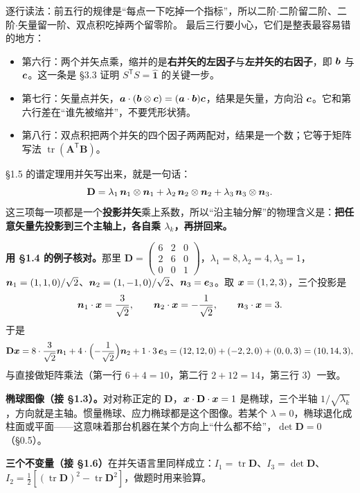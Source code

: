 \documentclass[11pt]{ctexart}
\newcommand{\ten}[1]{\mathbf{#1}}
\newcommand{\unitd}{\hat{\ten{1}}}
\newcommand{\tr}{\operatorname{tr}}
\let\origsubhdr\subhdr
\renewcommand{\subhdr}[1]{\par\needspace{3\baselineskip}\origsubhdr{#1}}
\begin{document}
逐行读法：前五行的规律是“每点一下吃掉一个指标”，所以二阶$\cdot$二阶留二阶、二阶$\cdot$矢量留一阶、双点积吃掉两个留零阶。
最后三行要小心，它们是整表最容易错的地方：
\begin{itemize}
\item 第六行：两个并矢点乘，缩并的是\textbf{右并矢的左因子}与\textbf{左并矢的右因子}，即 $\boldsymbol{b}$ 与 $\boldsymbol{c}$。这一条是 §3.3 证明 $S^{\mathsf T}S=\unitd$ 的关键一步。
\item 第七行：矢量点并矢，$\boldsymbol{a}\cdot(\boldsymbol{b}\otimes\boldsymbol{c})=(\boldsymbol{a}\cdot\boldsymbol{b})\boldsymbol{c}$，结果是矢量，方向沿 $\boldsymbol{c}$。它和第六行差在“谁先被缩并”，不要凭形状猜。
\item 第八行：双点积把两个并矢的四个因子两两配对，结果是一个数；它等于矩阵写法 $\tr(\ten A^{\mathsf T}\ten B)$。
\end{itemize}


§1.5 的谱定理用并矢写出来，就是一句话：
\[
\ten D=\lambda_1\,\vect n_1\otimes\vect n_1+\lambda_2\,\vect n_2\otimes\vect n_2+\lambda_3\,\vect n_3\otimes\vect n_3 .
\]
这三项每一项都是一个\textbf{投影并矢}乘上系数，所以“沿主轴分解”的物理含义是：\textbf{把任意矢量先投影到三个主轴上，各自乘 $\lambda_k$，再拼回来。}

\textbf{用 §1.4 的例子核对。}那里 $\ten D=\begin{pmatrix}6&2&0\\2&6&0\\0&0&1\end{pmatrix}$，$\lambda_1=8,\lambda_2=4,\lambda_3=1$，$\boldsymbol{n}_1=(1,1,0)/\sqrt2$、$\boldsymbol{n}_2=(1,-1,0)/\sqrt2$、$\boldsymbol{n}_3=\boldsymbol{e}_3$。取 $\boldsymbol{x}=(1,2,3)$，三个投影是
\[
\boldsymbol{n}_1\cdot\boldsymbol{x}=\frac{3}{\sqrt2},\qquad
\boldsymbol{n}_2\cdot\boldsymbol{x}=-\frac{1}{\sqrt2},\qquad
\boldsymbol{n}_3\cdot\boldsymbol{x}=3 .
\]
于是
\[
\ten D\vect x=8\cdot\frac{3}{\sqrt2}\vect n_1+4\cdot\Bigl(-\frac{1}{\sqrt2}\Bigr)\vect n_2+1\cdot3\,\vect e_3
=(12,12,0)+(-2,2,0)+(0,0,3)=(10,14,3),
\]
与直接做矩阵乘法（第一行 $6+4=10$，第二行 $2+12=14$，第三行 $3$）一致。

\textbf{椭球图像（接 §1.3）。}对对称正定的 $\ten D$，$\vect x\cdot\ten D\cdot\vect x=1$ 是椭球，三个半轴 $1/\sqrt{\lambda_k}$，方向就是主轴。惯量椭球、应力椭球都是这个图像。若某个 $\lambda=0$，椭球退化成柱面或平面——这意味着那台机器在某个方向上“什么都不给”，$\det\ten D=0$（§0.5）。

\textbf{三个不变量（接 §1.6）}在并矢语言里同样成立：$I_1=\tr\ten D$、$I_3=\det\ten D$、$I_2=\tfrac12[(\tr\ten D)^2-\tr\ten D^2]$，做题时用来验算。
\end{document}
